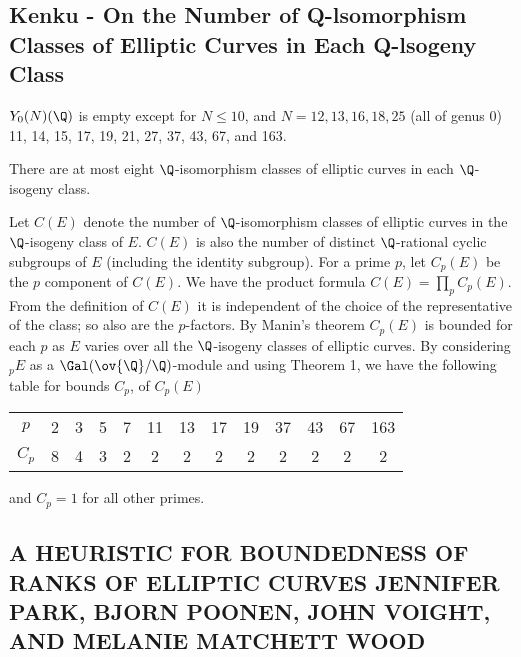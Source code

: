 
\subsection{Kenku -  On the Number of Q-lsomorphism Classes of Elliptic Curves in Each Q-lsogeny Class}


\begin{thm}
$Y_0(N)(\Q)$ is empty except for $N \leq 10$, and $N= 12, 13, 16, 18, 25$ (all of genus 0) 11, 14, 15, 17, 19, 21, 27, 37, 43, 67, and 163. 
\end{thm}

\begin{thm}
There are at most eight $\Q$-isomorphism classes of elliptic curves in each $\Q$-isogeny class. 
\end{thm}


Let $C(E)$ denote the number of $\Q$-isomorphism classes of elliptic curves in the $\Q$-isogeny class of $E$. $C(E)$ is also the number of distinct $\Q$-rational cyclic subgroups of $E$ (including the identity subgroup). For a prime $p$, let $C_p(E)$ be the $p$ component of $C(E)$. We have the product formula $C(E)= \prod_p C_p(E)$. From the definition of $C(E)$ it is independent of the choice of the representative of the class; so also are the $p$-factors. By Manin's theorem $C_p(E)$ is bounded for each $p$ as $E$ varies over all the $\Q$-isogeny classes of elliptic curves. By considering $_pE$ as a $\Gal(\ov{\Q}/\Q)$-module and using Theorem 1, we have the following table for bounds $C_p$, of $C_p(E)$
	\begin{table}[!ht]
	\centering
	\begin{tabular}{ccccccccccccc}
	$p$ & 2 & 3 & 5 & 7 & 11 & 13 & 17 & 19 & 37 & 43 & 67 & 163 \\ 
	$C_p$ & 8 & 4 & 3 & 2 & 2 & 2 & 2 & 2 & 2 & 2 & 2 & 2
	\end{tabular}
	\end{table}
and $C_p= 1$ for all other primes. 




\subsection{A HEURISTIC FOR BOUNDEDNESS OF RANKS OF ELLIPTIC CURVES JENNIFER PARK, BJORN POONEN, JOHN VOIGHT, AND MELANIE MATCHETT WOOD}


